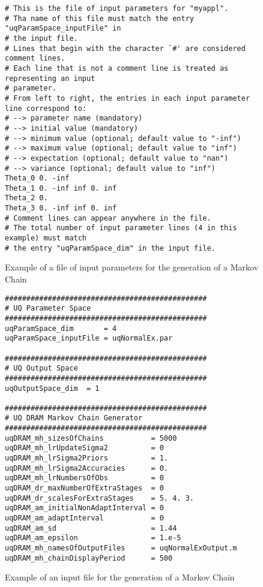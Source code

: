 \begin{figure}[h]
\begin{verbatim}
# This is the file of input parameters for "myappl".
# Tha name of this file must match the entry "uqParamSpace_inputFile" in
# the input file.
# Lines that begin with the character `#' are considered comment lines.
# Each line that is not a comment line is treated as representing an input
# parameter.
# From left to right, the entries in each input parameter line correspond to:
# --> parameter name (mandatory)
# --> initial value (mandatory)
# --> minimum value (optional; default value to "-inf")
# --> maximum value (optional; default value to "inf")
# --> expectation (optional; default value to "nan")
# --> variance (optional; default value to "inf")
Theta_0 0. -inf
Theta_1 0. -inf inf 0. inf
Theta_2 0.
Theta_3 0. -inf inf 0. inf
# Comment lines can appear anywhere in the file.
# The total number of input parameter lines (4 in this example) must match
# the entry "uqParamSpace_dim" in the input file.
\end{verbatim}
\caption{Example of a file of input parameters for the generation of a Markov Chain}
\label{fig-dram-par-file-ex}
\end{figure}

\begin{figure}[h]
\begin{verbatim}
###############################################
# UQ Parameter Space
###############################################
uqParamSpace_dim       = 4
uqParamSpace_inputFile = uqNormalEx.par

###############################################
# UQ Output Space
###############################################
uqOutputSpace_dim  = 1

###############################################
# UQ DRAM Markov Chain Generator
###############################################
uqDRAM_mh_sizesOfChains           = 5000
uqDRAM_mh_lrUpdateSigma2          = 0
uqDRAM_mh_lrSigma2Priors          = 1.
uqDRAM_mh_lrSigma2Accuracies      = 0.
uqDRAM_mh_lrNumbersOfObs          = 0
uqDRAM_dr_maxNumberOfExtraStages  = 0
uqDRAM_dr_scalesForExtraStages    = 5. 4. 3.
uqDRAM_am_initialNonAdaptInterval = 0
uqDRAM_am_adaptInterval           = 0
uqDRAM_am_sd                      = 1.44
uqDRAM_am_epsilon                 = 1.e-5
uqDRAM_mh_namesOfOutputFiles      = uqNormalExOutput.m
uqDRAM_mh_chainDisplayPeriod      = 500
\end{verbatim}
\caption{Example of an input file for the generation of a Markov Chain}
\label{fig-dram-input-file-ex}
\end{figure}

